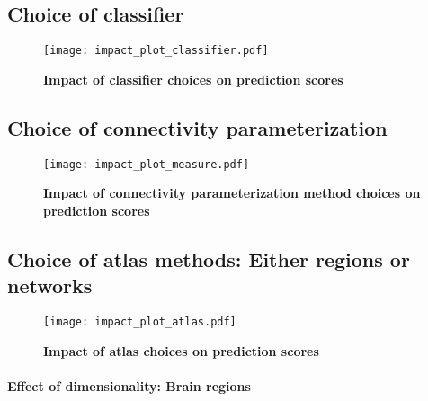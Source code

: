 \documentclass[5p]{elsarticle}
\begin{document}
 \subsection{Choice of classifier}

\begin{figure}
    \centerline{%
    \texttt{[image: impact\_plot\_classifier.pdf]}%
    }%
    \caption[choice of classifier]{\textbf{Impact of classifier choices on
    prediction scores}
\label{fig:impact_classifier}}
\end{figure}

\subsection{Choice of connectivity parameterization}


\begin{figure}
    \centerline{%
    \texttt{[image: impact\_plot\_measure.pdf]}%
    }%
    \caption[choice of classifier]{\textbf{Impact of connectivity
            parameterization method choices on prediction scores}
\label{fig:impact_connectivity}}
\end{figure}

\subsection{Choice of atlas methods: Either regions or networks}

\begin{figure}
    \centerline{%
    \texttt{[image: impact\_plot\_atlas.pdf]}%
    }%
    \caption[choice of atlas]{\textbf{Impact of atlas choices
        on prediction scores}
    \label{fig:impact_atlas}}
\end{figure}

\paragraph{Effect of dimensionality: Brain regions}
\end{document}
